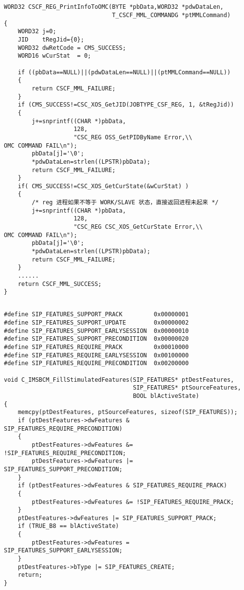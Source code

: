 ﻿\documentclass  [11pt,twocolumn]{article}
\begin{document}
\subsection{}
\begin{lstlisting}
WORD32 CSCF_REG_PrintInfoToOMC(BYTE *pbData,WORD32 *pdwDataLen,
                               T_CSCF_MML_COMMANDG *ptMMLCommand)
{
    WORD32 j=0;
    JID    tRegJid={0};
    WORD32 dwRetCode = CMS_SUCCESS;
    WORD16 wCurStat  = 0;

    if ((pbData==NULL)||(pdwDataLen==NULL)||(ptMMLCommand==NULL))
    {
        return CSCF_MML_FAILURE;
    }
    if (CMS_SUCCESS!=CSC_XOS_GetJID(JOBTYPE_CSF_REG, 1, &tRegJid))
    {
        j+=snprintf((CHAR *)pbData,
                    128,
                    "CSC_REG OSS_GetPIDByName Error,\\
OMC COMMAND FAIL\n");
        pbData[j]='\0';
        *pdwDataLen=strlen((LPSTR)pbData);
        return CSCF_MML_FAILURE;
    }
    if( CMS_SUCCESS!=CSC_XOS_GetCurState(&wCurStat) )
    {
        /* reg 进程如果不等于 WORK/SLAVE 状态，直接返回进程未起来 */
        j+=snprintf((CHAR *)pbData,
                    128,
                    "CSC_REG CSC_XOS_GetCurState Error,\\
OMC COMMAND FAIL\n");
        pbData[j]='\0';
        *pdwDataLen=strlen((LPSTR)pbData);
        return CSCF_MML_FAILURE;
    }
    ......
    return CSCF_MML_SUCCESS;
}
\end{lstlisting}

\subsection{}
\begin{lstlisting}
#define SIP_FEATURES_SUPPORT_PRACK         0x00000001
#define SIP_FEATURES_SUPPORT_UPDATE        0x00000002
#define SIP_FEATURES_SUPPORT_EARLYSESSION  0x00000010
#define SIP_FEATURES_SUPPORT_PRECONDITION  0x00000020
#define SIP_FEATURES_REQUIRE_PRACK         0x00010000
#define SIP_FEATURES_REQUIRE_EARLYSESSION  0x00100000
#define SIP_FEATURES_REQUIRE_PRECONDITION  0x00200000

void C_IMSBCM_FillStimulatedFeatures(SIP_FEATURES* ptDestFeatures,
                                     SIP_FEATURES* ptSourceFeatures,
                                     BOOL blActiveState)
{
	memcpy(ptDestFeatures, ptSourceFeatures, sizeof(SIP_FEATURES));
    if (ptDestFeatures->dwFeatures & SIP_FEATURES_REQUIRE_PRECONDITION)
    {
        ptDestFeatures->dwFeatures &= !SIP_FEATURES_REQUIRE_PRECONDITION;
        ptDestFeatures->dwFeatures |= SIP_FEATURES_SUPPORT_PRECONDITION;
    }
    if (ptDestFeatures->dwFeatures & SIP_FEATURES_REQUIRE_PRACK)
    {
	    ptDestFeatures->dwFeatures &= !SIP_FEATURES_REQUIRE_PRACK;
    }
    ptDestFeatures->dwFeatures |= SIP_FEATURES_SUPPORT_PRACK;
    if (TRUE_B8 == blActiveState)
    {
        ptDestFeatures->dwFeatures = SIP_FEATURES_SUPPORT_EARLYSESSION;
    }
    ptDestFeatures->bType |= SIP_FEATURES_CREATE;
    return;
}
\end{lstlisting}
\end{document}
